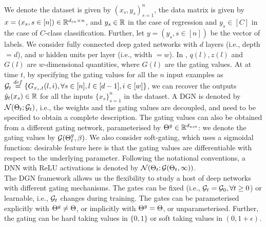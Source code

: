 We denote the dataset is given by $(x_s,y_s)_{s=1}^n$, the data matrix is given by $x=(x_s,s\in[n])\in\mathbb{R}^{d_{in}\times n}$, and $y_s\in\mathbb{R}$ in the case of regression and $y_s\in[C]$ in the case of $C$-class classification. Further, let $y=(y_s,s\in[n])$ be the vector of labels. We consider fully connected deep gated networks with $d$ layers (i.e., depth $=d$), and $w$ hidden units per layer (i.e., width $=w$). In , $q(l),z(l)$ and $G(l)$ are $w$-dimensional quantities, where $G(l)$ are the gating values.  At at time $t$, by specifying the gating values for all the $n$ input examples as $\mathcal{G}_t\stackrel{def}=\{G_{x_{s},t}(l,i), \forall s\in[n],l\in[d-1],i\in[w]\}$, we can recover the outputs $\hat{y}_t(x_s)\in \mathbb{R}$ for all the inputs $\{x_s\}_{s=1}^n$ in the dataset.  A DGN is denoted by $\mathcal{N}(\Theta_t;\mathcal{G}_t)$, i.e., the weights and the gating values are decoupled, and need to be specified to obtain a complete description. The gating values can also be obtained from a different gating network, parameterised by ${\Theta}^g\in\mathbb{R}^{d_{net}}$: we denote the gating values by $\mathcal{G}({\Theta}^g_t,\beta)$. We also consider soft-gating, which uses a sigmoidal function: desirable feature here is that the gating values are differentiable with respect to the underlying parameter. Following the notational conventions, a DNN with ReLU activations is denoted by $\mathcal{N}(\Theta_t;\mathcal{G}(\Theta_t,\infty))$.\\
The DGN framework allows us the flexibility to study a host of deep networks with different gating mechanisms. The gates can be fixed (i.e., $\mathcal{G}_t=\mathcal{G}_0,\forall t\geq 0$) or learnable, i.e., $\mathcal{G}_t$ changes during training. The gates can be parameterised explicitly with ${\Theta}^g\neq \Theta$, or implicitly with ${\Theta}^g=\Theta$, or unparameterised. Further, the gating can be hard taking values in $\{0,1\}$ or soft taking values in $(0,1+\epsilon)$.
